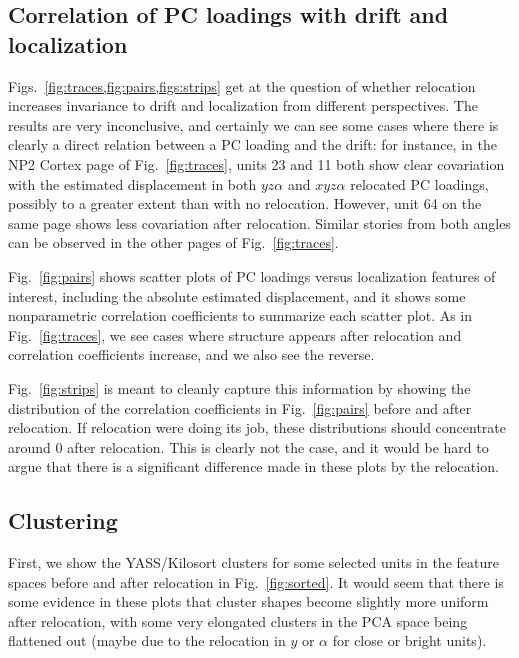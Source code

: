 \documentclass[
  12pt,
]{article}
\theoremstyle{plain}
\theoremstyle{definition}
\theoremstyle{remark}
\newcommand{\1}[1]{\mathbb{1}_{{#1}}}
\begin{document}
\subsection{Correlation of PC loadings with drift and localization}

Figs.~\cref{fig:traces,fig:pairs,figs:strips} get at the question of whether relocation increases invariance to drift and localization from different perspectives. The results are very inconclusive, and certainly we can see some cases where there is clearly a direct relation between a PC loading and the drift: for instance, in the NP2 Cortex page of Fig.~\ref{fig:traces}, units 23 and 11 both show clear covariation with the estimated displacement in both $yz\alpha$ and $xyz\alpha$ relocated PC loadings, possibly to a greater extent than with no relocation. However, unit 64 on the same page shows less covariation after relocation. Similar stories from both angles can be observed in the other pages of Fig.~\ref{fig:traces}.

Fig.~\ref{fig:pairs} shows scatter plots of PC loadings versus localization features of interest, including the absolute estimated displacement, and it shows some nonparametric correlation coefficients to summarize each scatter plot. As in Fig.~\ref{fig:traces}, we see cases where structure appears after relocation and correlation coefficients increase, and we also see the reverse.

Fig.~\ref{fig:strips} is meant to cleanly capture this information by showing the distribution of the correlation coefficients in Fig.~\ref{fig:pairs} before and after relocation. If relocation were doing its job, these distributions should concentrate around 0 after relocation. This is clearly not the case, and it would be hard to argue that there is a significant difference made in these plots by the relocation.

\subsection{Clustering}

First, we show the YASS/Kilosort clusters for some selected units in the feature spaces before and after relocation in Fig.~\ref{fig:sorted}. It would seem that there is some evidence in these plots that cluster shapes become slightly more uniform after relocation, with some very elongated clusters in the PCA space being flattened out (maybe due to the relocation in $y$ or $\alpha$ for close or bright units).
\end{document}
